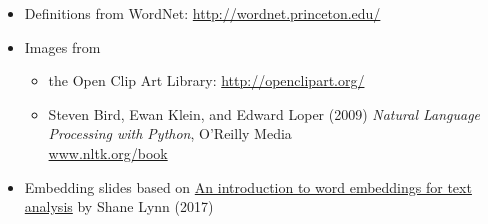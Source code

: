 \documentclass[a4paper,landscape,headrule,footrule,xetex]{foils}
\begin{document}

\begin{itemize}
\item Definitions from WordNet: \url{http://wordnet.princeton.edu/}
\item Images from
  \begin{itemize}
  \item the Open Clip Art Library: \url{http://openclipart.org/}
  \item Steven Bird, Ewan Klein, and Edward Loper (2009) 
     \textit{Natural Language Processing with Python}, O'Reilly Media
    \\ \url{www.nltk.org/book}
  \end{itemize}
\item Embedding slides based on \href{https://www.shanelynn.ie/get-busy-with-word-embeddings-introduction/}{An introduction to word embeddings for text analysis} by Shane Lynn (2017)
\end{itemize}









  
\small


\end{document}
